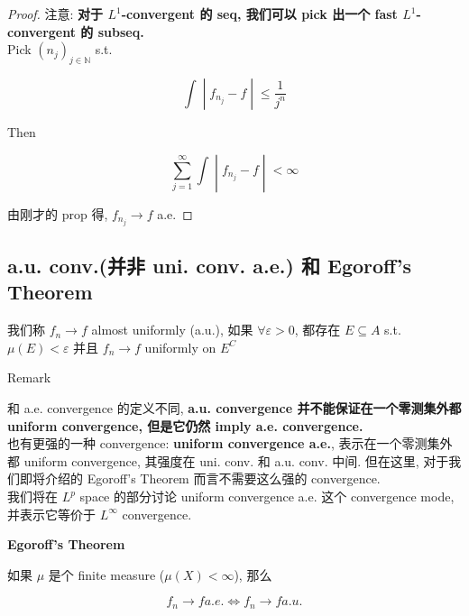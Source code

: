 \documentclass{qlnotes-export}
\begin{document}
\begin{proof}

注意: \textbf{对于 \(L^{1}\)-convergent 的 seq, 我们可以 pick 出一个 fast \(L^{1}\)-convergent 的 subseq.}\\
Pick \((n_{j})_{j \in {\mathbb{N}}}\) s.t.

\[\left. \int \middle| f_{n_{j}} - f \middle| \leq \frac{1}{j^{n}} \right.\]

Then

\[\left. \sum\limits_{j = 1}^{\infty}\int \middle| f_{n_{j}} - f \middle| < \infty \right.\]

由刚才的 prop 得, \(f_{n_{j}}\rightarrow f\) a.e.

\end{proof}

\subsection{a.u. conv.(并非 uni. conv. a.e.) 和 Egoroff's Theorem}\label{a.u.-conv.ux5e76ux975e-uni.-conv.-a.e.-ux548c-egoroffs-theorem}

\begin{definition}

我们称 \(f_{n}\rightarrow f\) almost uniformly (a.u.), 如果 \(\forall\varepsilon > 0\), 都存在 \(E \subseteq A\) s.t. \(\mu(E) < \varepsilon\) 并且 \(f_{n}\rightarrow f\) uniformly on \(E^{C}\)

\end{definition}

\begin{qlremark}{Remark}

和 a.e. convergence 的定义不同, \textbf{a.u. convergence 并不能保证在一个零测集外都 uniform convergence, 但是它仍然 imply a.e. convergence.}\\
也有更强的一种 convergence: \textbf{uniform convergence a.e.}, 表示在一个零测集外都 uniform convergence, 其强度在 uni. conv. 和 a.u. conv. 中间. 但在这里, 对于我们即将介绍的 Egoroff's Theorem 而言不需要这么强的 convergence.\\
我们将在 \(L^{p}\) space 的部分讨论 uniform convergence a.e. 这个 convergence mode, 并表示它等价于 \(L^{\infty}\) convergence.

\end{qlremark}

\begin{theorem}{\protect{}\label{kn-egoroff-s-theorem}{\textbf{Egoroff's
Theorem}}}

如果 \(\mu\) 是个 finite measure (\(\mu(X) < \infty\)), 那么

\[f_{n}\rightarrow f a.e.\Leftrightarrow f_{n}\rightarrow f a.u.\]

\end{theorem}
\end{document}
